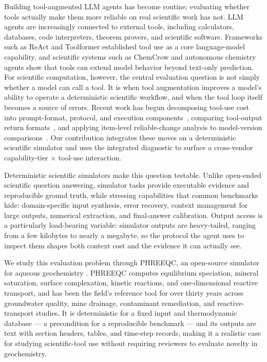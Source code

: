 \documentclass{article}
\begin{document}
Building tool-augmented LLM agents has become routine; evaluating whether tools actually make them more reliable on real scientific work has not. LLM agents are increasingly connected to external tools, including calculators, databases, code interpreters, theorem provers, and scientific software. Frameworks such as ReAct \citep{yao2023react} and Toolformer \citep{schick2023toolformer} established tool use as a core language-model capability, and scientific systems such as ChemCrow \citep{bran2024chemcrow} and autonomous chemistry agents \citep{boiko2023autonomous} show that tools can extend model behavior beyond text-only prediction. For scientific computation, however, the central evaluation question is not simply whether a model can call a tool. It is when tool augmentation improves a model's ability to operate a deterministic scientific workflow, and when the tool loop itself becomes a source of errors. Recent work has begun decomposing tool-use cost into prompt-format, protocol, and execution components~\citep{toolusetax2026}, comparing tool-output return formats~\citep{toolouts2025}, and applying item-level reliable-change analysis to model-version comparisons~\citep{rci2026}. Our contribution integrates these moves on a deterministic scientific simulator and uses the integrated diagnostic to surface a cross-vendor capability-tier $\times$ tool-use interaction.

Deterministic scientific simulators make this question testable. Unlike open-ended scientific question answering, simulator tasks provide executable evidence and reproducible ground truth, while stressing capabilities that common benchmarks hide: domain-specific input synthesis, error recovery, context management for large outputs, numerical extraction, and final-answer calibration. Output access is a particularly load-bearing variable: simulator outputs are heavy-tailed, ranging from a few kilobytes to nearly a megabyte, so the protocol the agent uses to inspect them shapes both context cost and the evidence it can actually see.

We study this evaluation problem through PHREEQC, an open-source simulator for aqueous geochemistry \citep{parkhurst2013phreeqc,appelo2004geochemistry}. PHREEQC computes equilibrium speciation, mineral saturation, surface complexation, kinetic reactions, and one-dimensional reactive transport, and has been the field's reference tool for over thirty years across groundwater quality, mine drainage, contaminant remediation, and reactive-transport studies. It is deterministic for a fixed input and thermodynamic database --- a precondition for a reproducible benchmark --- and its outputs are text with section headers, tables, and time-step records, making it a realistic case for studying scientific-tool use without requiring reviewers to evaluate novelty in geochemistry.
\end{document}

